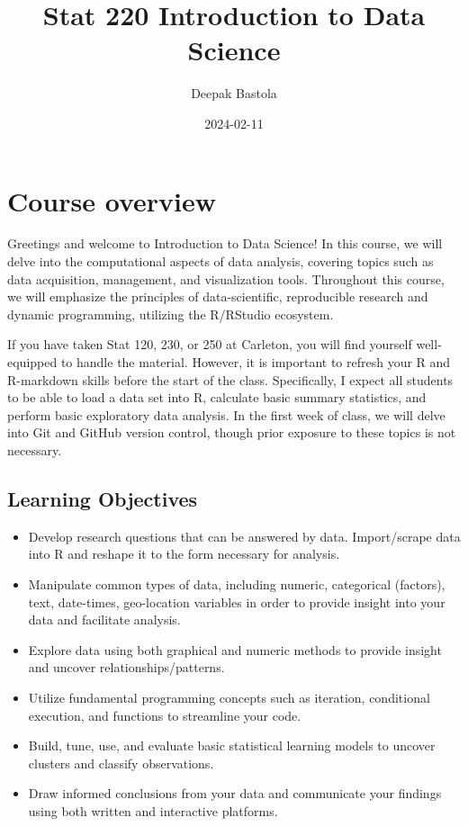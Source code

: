 \documentclass[
]{book}
\title{Stat 220 Introduction to Data Science}
\author{Deepak Bastola}
\date{2024-02-11}
\providecommand{\tightlist}{%
  \setlength{\itemsep}{0pt}\setlength{\parskip}{0pt}}
\begin{document}
\maketitle

{
\setcounter{tocdepth}{1}
\tableofcontents
}
\hypertarget{course-overview}{%
\chapter*{Course overview}\label{course-overview}}

Greetings and welcome to Introduction to Data Science! In this course, we will delve into the computational aspects of data analysis, covering topics such as data acquisition, management, and visualization tools. Throughout this course, we will emphasize the principles of data-scientific, reproducible research and dynamic programming, utilizing the R/RStudio ecosystem.

If you have taken Stat 120, 230, or 250 at Carleton, you will find yourself well-equipped to handle the material. However, it is important to refresh your R and R-markdown skills before the start of the class. Specifically, I expect all students to be able to load a data set into R, calculate basic summary statistics, and perform basic exploratory data analysis. In the first week of class, we will delve into Git and GitHub version control, though prior exposure to these topics is not necessary.

\hypertarget{learning-objectives}{%
\section{Learning Objectives}\label{learning-objectives}}

\begin{itemize}
\tightlist
\item
  Develop research questions that can be answered by data. Import/scrape data into R and reshape it to the form necessary for analysis.
\item
  Manipulate common types of data, including numeric, categorical (factors), text, date-times, geo-location variables in order to provide insight into your data and facilitate analysis.
\item
  Explore data using both graphical and numeric methods to provide insight and uncover relationships/patterns.
\item
  Utilize fundamental programming concepts such as iteration, conditional execution, and functions to streamline your code.
\item
  Build, tune, use, and evaluate basic statistical learning models to uncover clusters and classify observations.
\item
  Draw informed conclusions from your data and communicate your findings using both written and interactive platforms.
\end{itemize}
\end{document}
